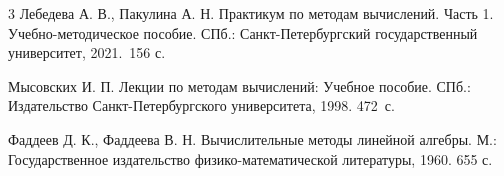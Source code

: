 \documentclass[12pt]{article}
\begin{document}
    \renewcommand{\bibname}{{Список литературы}}
    
    \begin{thebibliography}{3}
        Лебедева А. В., Пакулина А. Н. Практикум по методам вычислений. Часть 1. Учебно-методическое пособие. СПб.: Санкт-Петербургский государственный университет, 2021.~156 с.
        
        Мысовских И. П. Лекции по методам вычислений: Учебное пособие. СПб.: Издательство Санкт-Петербургского университета, 1998. 472~с.
        
        Фаддеев Д. К., Фаддеева В. Н. Вычислительные методы линейной алгебры. М.:  Государственное издательство физико-математической литературы, 1960. 655 с.
    \end{thebibliography}
\end{document}

